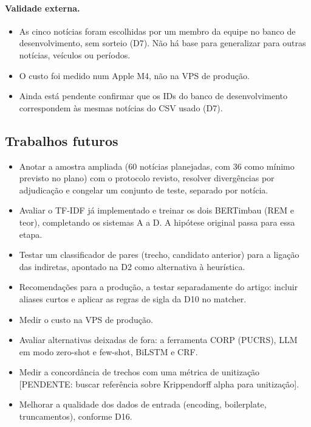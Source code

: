 \documentclass[11pt,a4paper]{article}
\newcommand{\pend}[1]{\textcolor{red!60!black}{[PENDENTE: #1]}}
\begin{document}
\paragraph{Validade externa.}
\begin{itemize}
\item As cinco notícias foram escolhidas por um membro da equipe no banco de desenvolvimento, sem sorteio (D7). Não há base para generalizar para outras notícias, veículos ou períodos.
\item O custo foi medido num Apple M4, não na VPS de produção.
\item Ainda está pendente confirmar que os IDs do banco de desenvolvimento correspondem às mesmas notícias do CSV usado (D7).
\end{itemize}

\subsection{Trabalhos futuros}

\begin{itemize}
\item Anotar a amostra ampliada (60 notícias planejadas, com 36 como mínimo previsto no plano) com o protocolo revisto, resolver divergências por adjudicação e congelar um conjunto de teste, separado por notícia.
\item Avaliar o TF-IDF já implementado e treinar os dois BERTimbau (REM e teor), completando os sistemas A a D. A hipótese original passa para essa etapa.
\item Testar um classificador de pares (trecho, candidato anterior) para a ligação das indiretas, apontado na D2 como alternativa à heurística.
\item Recomendações para a produção, a testar separadamente do artigo: incluir aliases curtos e aplicar as regras de sigla da D10 no matcher.
\item Medir o custo na VPS de produção.
\item Avaliar alternativas deixadas de fora: a ferramenta CORP (PUCRS), LLM em modo zero-shot e few-shot, BiLSTM e CRF.
\item Medir a concordância de trechos com uma métrica de unitização \pend{buscar referência sobre Krippendorff alpha para unitização}.
\item Melhorar a qualidade dos dados de entrada (encoding, boilerplate, truncamentos), conforme D16.
\end{itemize}

\end{document}
